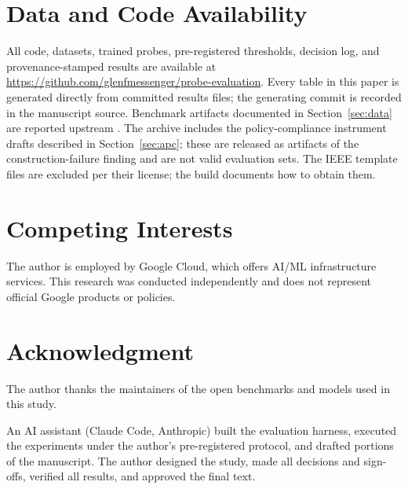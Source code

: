 \section*{Data and Code Availability}
\label{sec:avail}

All code, datasets, trained probes, pre-registered thresholds, decision log, and provenance-stamped results are
available at \url{https://github.com/glenfmessenger/probe-evaluation}. Every table in this paper is generated directly from committed results files; the generating commit is
recorded in the manuscript source. Benchmark artifacts documented in Section~\ref{sec:data} are reported upstream \cite{injecagentissue7}. The archive includes the policy-compliance instrument
drafts described in Section~\ref{sec:apc}; these are released as artifacts of the construction-failure finding and are
not valid evaluation sets. The IEEE template files are excluded per their license; the build documents how to obtain
them.

\section*{Competing Interests}

The author is employed by Google Cloud, which offers AI/ML infrastructure services. This research was conducted
independently and does not represent official Google products or policies.

\section*{Acknowledgment}

The author thanks the maintainers of the open benchmarks and models used in this study.

An AI assistant (Claude Code, Anthropic) built the evaluation harness, executed the experiments under the author's
pre-registered protocol, and drafted portions of the manuscript. The author designed the study, made all decisions and
sign-offs, verified all results, and approved the final text.
